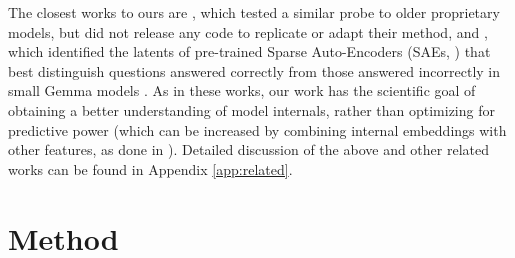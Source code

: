 \documentclass{article} %
\begin{document}
The closest works to ours are \citet{DBLP:journals/corr/abs-2207-05221}, which tested a similar probe to older proprietary models, but did not release any code to replicate or adapt their method, and \citet{ferrando2025do}, which identified the latents of pre-trained Sparse Auto-Encoders (SAEs, \citealp{bricken2023monosemanticity}) that best distinguish questions answered correctly from those answered incorrectly in small Gemma models \citep{gemmateam2024gemma2improvingopen}. As in these works, our work has the scientific goal of obtaining a better understanding of model internals, rather than optimizing for predictive power (which can be increased by combining internal embeddings with other features, as done in \citealp{kamath-etal-2020-selective}).
Detailed discussion of the above and other related works can be found in Appendix \ref{app:related}.

\section{Method}
\end{document}
